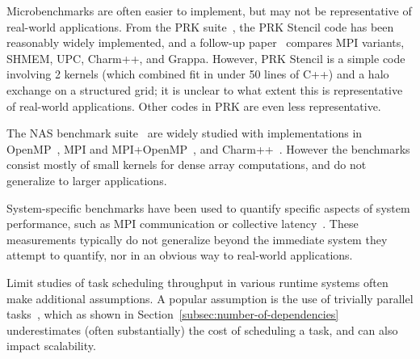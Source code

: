 Microbenchmarks are often easier to implement, but may not be
representative of real-world applications. From the PRK
suite~\cite{PRK14}, the PRK Stencil code has been reasonably widely
implemented, and a follow-up paper~\cite{PRKRuntimes16} compares MPI
variants, SHMEM, UPC, Charm++, and Grappa. However, PRK Stencil is a
simple code involving 2 kernels (which combined fit in under 50 lines
of C++) and a halo exchange on a structured grid; it is unclear to
what extent this is representative of real-world applications. Other
codes in PRK are even less representative.

The NAS benchmark suite~\cite{NAS91, NAS95} are widely studied with
implementations in OpenMP~\cite{NASOpenMP99}, MPI and
MPI+OpenMP~\cite{NASMPIOpenMP00}, and
Charm++~\cite{NASCharm96}. However the benchmarks consist mostly of small
kernels for dense array computations, and do not generalize to larger
applications.

System-specific benchmarks have been used to quantify specific aspects
of system performance, such as MPI communication or collective
latency~\cite{MPPTest99, MPIBench01}. These measurements typically do
not generalize beyond the immediate system they attempt to quantify,
nor in an obvious way to real-world applications.

Limit studies of task scheduling throughput in various runtime systems
often make additional assumptions. A popular assumption is the use of
trivially parallel tasks~\cite{Canary16, Armstrong14}, which as shown
in Section~\ref{subsec:number-of-dependencies} underestimates (often
substantially) the cost of scheduling a task, and can also impact scalability.
